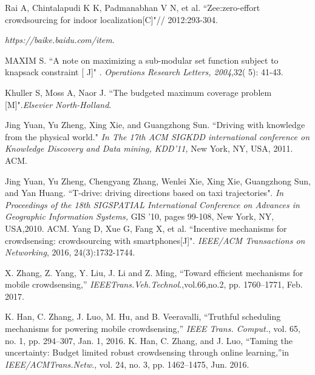 \documentclass[journal]{IEEEtran}
\begin{document}
\begin{thebibliography}{1}
 Rai A, Chintalapudi K K, Padmanabhan V N, et al. ``Zee:zero-effort crowdsourcing for indoor localization[C]"// 2012:293-304.
 
\textit{https://baike.baidu.com/item}.

 MAXIM S. ``A note on maximizing a sub-modular set function subject to knapsack constraint [ J]" . \textit{Operations Research Letters, 2004},32( 5): 41-43.
 
Khuller S, Moss A, Naor J. ``The budgeted maximum coverage problem [M]".\textit{Elsevier North-Holland}.

Jing Yuan, Yu Zheng, Xing Xie, and Guangzhong Sun. ``Driving with knowledge from the physical world." \textit{In The 17th ACM SIGKDD international conference on Knowledge Discovery and Data mining, KDD’11,} New York, NY, USA, 2011. ACM.

Jing Yuan, Yu Zheng, Chengyang Zhang, Wenlei Xie, Xing Xie, Guangzhong Sun, and Yan Huang. ``T-drive: driving directions based on taxi trajectories". \textit{In Proceedings of the 18th SIGSPATIAL International Conference on Advances in Geographic Information Systems,} GIS ’10, pages 99-108, New York, NY, USA,2010. ACM.
Yang D, Xue G, Fang X, et al. ``Incentive mechanisms for crowdsensing: crowdsourcing with smartphones[J]". \textit{IEEE/ACM Transactions on Networking}, 2016, 24(3):1732-1744.

X. Zhang, Z. Yang, Y. Liu, J. Li and Z. Ming, “Toward efﬁcient mechanisms for mobile crowdsensing,” \textit{IEEETrans.Veh.Technol}.,vol.66,no.2, pp. 1760–1771, Feb. 2017. 

K. Han, C. Zhang, J. Luo, M. Hu, and B. Veeravalli, “Truthful scheduling mechanisms for powering mobile crowdsensing,” \textit{IEEE Trans. Comput.}, vol. 65, no. 1, pp. 294–307, Jan. 1, 2016.
K. Han, C. Zhang, and J. Luo, “Taming the uncertainty: Budget limited robust crowdsensing through online learning,”in \textit{IEEE/ACMTrans.Netw}., vol. 24, no. 3, pp. 1462–1475, Jun. 2016. 


\end{thebibliography}
\end{document}
